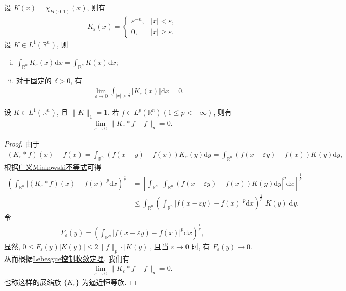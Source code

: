 \documentclass[../../main.tex]{subfiles}%
\begin{document}
\begin{proposition}
设 $K(x)=\chi_{B(0,1)}(x)$, 则有
\begin{align*}
K_\varepsilon(x) = 
\begin{cases}
\varepsilon^{-n}, & |x|<\varepsilon, \\
0, & |x| \geqslant \varepsilon.
\end{cases}
\end{align*}
设 $K\in L^1(\mathbb{R}^n)$, 则
\begin{enumerate}[(i)]
\item $\displaystyle \int_{\mathbb{R}^n} K_\varepsilon(x) \mathrm{d}x = \int_{\mathbb{R}^n} K(x) \mathrm{d}x$;
\item 对于固定的 $\delta>0$, 有
\begin{align*}
\lim\limits_{\varepsilon\to 0} \int_{|x|>\delta} |K_\varepsilon(x)| \mathrm{d}x = 0.
\end{align*}
\end{enumerate}
\end{proposition}

\begin{theorem}\label{theorem:实变函数--定理6.22}
设 $K\in L^1(\mathbb{R}^n)$, 且 $\|K\|_1=1$. 若 $f\in L^p(\mathbb{R}^n)(1\leqslant p<+\infty)$, 则有
\begin{align}
\lim\limits_{\varepsilon\to 0} \|K_\varepsilon * f - f\|_p = 0.
\label{eq:approx_id}
\end{align}
\end{theorem}
\begin{proof}

由于
\begin{align*}
(K_\varepsilon * f)(x) - f(x) = \int_{\mathbb{R}^n} (f(x-y)-f(x)) K_\varepsilon(y) \mathrm{d}y 
= \int_{\mathbb{R}^n} (f(x-\varepsilon y)-f(x)) K(y) \mathrm{d}y,
\end{align*}
根据\hyperref[theorem:广义Minkowski不等式]{广义Minkowski不等式}可得
\begin{align*}
\left( \int_{\mathbb{R}^n} |(K_\varepsilon * f)(x) - f(x)|^p \mathrm{d}x \right)^{\frac{1}{p}}
&= \left[ \int_{\mathbb{R}^n} \left| \int_{\mathbb{R}^n} (f(x-\varepsilon y)-f(x)) K(y) \mathrm{d}y \right|^p \mathrm{d}x \right]^{\frac{1}{p}} \\
&\leqslant \int_{\mathbb{R}^n} \left( \int_{\mathbb{R}^n} |f(x-\varepsilon y)-f(x)|^p \mathrm{d}x \right)^{\frac{1}{p}} |K(y)| \mathrm{d}y.
\end{align*}
令
\begin{align*}
F_\varepsilon(y) = \left( \int_{\mathbb{R}^n} |f(x-\varepsilon y)-f(x)|^p \mathrm{d}x \right)^{\frac{1}{p}},
\end{align*}
显然, $0\leqslant F_\varepsilon(y)|K(y)| \leqslant 2\|f\|_p \cdot |K(y)|$, 且当 $\varepsilon\to 0$ 时, 有 $F_\varepsilon(y)\to 0$. 从而根据\hyperref[theorem:控制收敛定理]{Lebesgue控制收敛定理}, 我们有
\begin{align*}
\lim\limits_{\varepsilon\to 0} \|K_\varepsilon * f - f\|_p = 0.
\end{align*}
也称这样的展缩族 $\{K_\varepsilon\}$ 为逼近恒等族.

\end{proof}
\end{document}
